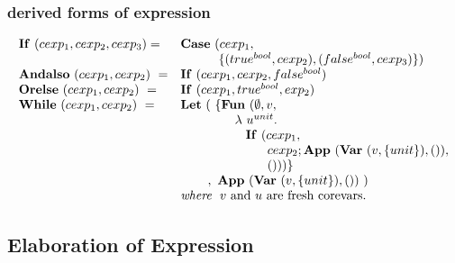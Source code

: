 \documentclass[11pt,a4paper]{article}
\newcommand{\key}[1]{\textrm{\textbf{#1}}}
\newcommand{\whereclause}[1]{\textit{where}\hspace{1.5ex}#1}
\newcommand{\braced}[1]{\{#1\}}
\newcommand{\lam}  {\mathbf\lambda}
\begin{document}
\subsubsection {derived forms of expression}
\[\begin{array}{ll}
  \key{If}\ (cexp_1, cexp_2, cexp_3) = & \key{Case}\ (cexp_1, \\
                                       & \hspace{7ex}\braced{(true^{bool}, cexp_2), (false^{bool}, cexp_3)})  \\
\key{Andalso}\ (cexp_1, cexp_2)\     = & \key{If}\ (cexp_1, cexp_2, false^{bool}) \\
\key{Orelse} \ (cexp_1, cexp_2)\     = & \key{If}\ (cexp_1, true^{bool}, exp_2)   \\
\key{While}  \ (cexp_1, cexp_2)\     = & \key{Let}\  (\ \braced{\key{Fun}\ (\emptyset, v, \\
                                       & \hspace{10ex}\lam\ u^{unit}. \\
                                       & \hspace{12ex}\key{If}\ (cexp_1, \\
                                       & \hspace{16ex} cexp_2;\key{App}\ (\key{Var}\ (v,\braced{unit}), ()) , \\
                                       & \hspace{16ex} ()))} \\
                                       & \hspace{5ex},\ \key{App}\ (\key{Var}\ (v,\braced{unit}),())\ ) \\
                                       & \whereclause{\textrm{$v$ and $u$ are fresh corevars.}}
\end{array}\]

\subsection {Elaboration of Expression}
\end{document}
